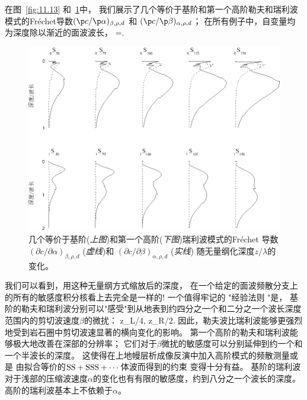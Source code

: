 在图~\ref{fig:11.13} 和~\ref{fig:11.14}中，
我们展示了几个等价于基阶和第一个高阶勒夫和瑞利波模式的Fr\'{e}chet导数$(\p c/\p\alpha)_{\beta,\rho,d}$
和 $(\p c/\p\beta)_{\alpha,\rho,d}$；
在所有例子中，自变量均为深度除以渐近的面波波长，
\eq
{}=.
\en 
\begin{figure}[!t]
\begin{center}
\includegraphics{../figures/chap11/fig24.eps}
\end{center}
\caption[Rayleigh kernels]{
\label{fig:11.14}
几个等价于基阶({\em 上图\/})和第一个高阶({\em 下图\/})瑞利波模式的Fr\'{e}chet 导数
$(\partial c/\partial\alpha)_{\beta,\rho,d}$
({\em 虚线\/})和
$(\partial c/\partial\beta)_{\alpha,\rho,d}$
({\em 实线\/})
随无量纲化深度$z/\lambda$的变化。}
\end{figure}
我们可以看到，用这种无量纲方式缩放后的深度，
在一个给定的面波频散分支上的所有的敏感度积分核看上去完全是一样的!
一个值得牢记的 "经验法则 "是，
基阶的勒夫和瑞利波分别可以"感受"到从地表到约四分之一个和二分之一个波长深度范围内的剪切波速度$\beta$的微扰：
\eq \label{11.skind}
z_{\rm L}\approx\lambda/4,\qquad
z_{\rm R}\approx\lambda/2.
\en
因此，勒夫波比瑞利波能够更强烈地受到岩石圈中剪切波速显著的横向变化的影响。
第一个高阶的勒夫和瑞利波能够极大地改善在深部的分辨率；
%
%
它们对于$\beta$微扰的敏感度可以分别延伸到约一个和一个半波长的深度。
这使得在上地幔层析成像反演中加入高阶模式的频散测量或是
由拟合等价的${\rm SS}+{\rm SSS}+\cdots$体波而得到的约束
变得十分有益。
基阶的瑞利波对于浅部的压缩波速度$\alpha$的变化也有有限的敏感度，约到八分之一个波长的深度。
高阶的瑞利波基本上不依赖于$\alpha$。
%
%

